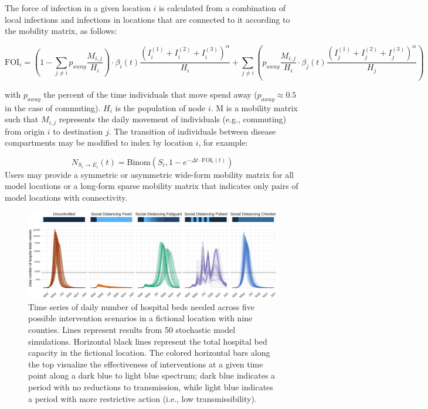 {The force of infection in a given location $i$ is calculated from a combination of local infections and infections in locations that are connected to it according to the mobility matrix, as follows:
\begin{fullwidth}
\begin{equation}
\text{FOI}_i = \left(1 - \sum_{j\neq i} p_{away} \frac{M_{i,j}}{H_i} \right) \cdot \beta_i(t) \frac{\left(I_i^{(1)} + I_i^{(2)} + I_i^{(3)}\right)^\alpha}{H_i} +  \sum_{j \neq i} \left(p_{away} \frac{M_{i,j}}{H_i} \cdot \beta_j(t) \frac{\left(I_j^{(1)} + I_j^{(2)} + I_j^{(3)}\right)^\alpha}{H_j} \right)
\end{equation}
\end{fullwidth}

with $p_{away}$ the percent of the time individuals that move spend away ($p_{away} \approx 0.5$ in the case of commuting). $H_i$ is the population of node $i$. M is a mobility matrix such that $M_{i,j}$ represents the daily movement of individuals (e.g., commuting) from origin $i$ to destination $j$. The transition of individuals between disease compartments may be modified to index by location $i$, for example:

\begin{equation}
N_{S_i \to E_i} (t) = \text{Binom}\left(S_i ,1 - e^{- \Delta t \cdot\text{FOI}_{i}(t) } \right)
\end{equation}
Users may provide a symmetric or asymmetric wide-form mobility matrix for all model locations or a long-form sparse mobility matrix that indicates only pairs of model locations with connectivity.
\begin{figure}[!htb]%
    \centering
    \includegraphics{fig_pipeline/fig2a}
    \caption[Time series of daily number of hospital beds needed across scenarios]{Time series of daily number of hospital beds needed across five possible intervention scenarios in a fictional location with nine counties. Lines represent results from 50 stochastic model simulations. Horizontal black lines represent the total hospital bed capacity in the fictional location. The colored horizontal bars along the top visualize the effectiveness of interventions at a given time point along a dark blue to light blue spectrum; dark blue indicates a period with no reductions to transmission, while light blue indicates a period with more restrictive action (i.e., low transmissibility).}
    \label{fig:pipeline-seir}
\end{figure}


}
